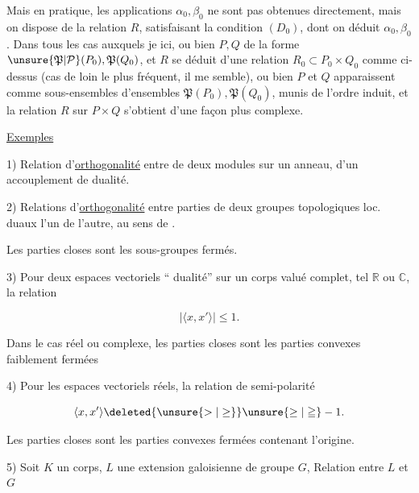Mais en pratique, les applications $\alpha_0,\beta_0$ ne sont pas obtenues directement, mais on dispose de la relation $R$, satisfaisant la condition $(D_0)$, dont on déduit $\alpha_0,\beta_0$. Dans tous les cas auxquels je   ici, ou bien $P,Q$  de la forme $\unsure{\mathfrak P|\mathcal P}(P_0),\mathfrak P(Q_0)$, et $R$ se déduit d'une relation $R_0\subset P_0\times Q_0$ comme ci-dessus (cas de loin le plus fréquent, il me semble), ou bien $P$ et $Q$ apparaissent comme sous-ensembles  d'ensembles $\mathfrak P(P_0),\mathfrak P(Q_0)$, munis de l'ordre induit, et la relation $R$ sur $P\times Q$ s'obtient d'une façon plus complexe.

\uline{Exemples}

1) Relation d'\uline{orthogonalité} entre  de deux modules sur un anneau,  d'un accouplement de dualité. 


2) Relations d'\uline{orthogonalité} entre parties de deux groupes topologiques  loc.  duaux l'un de l'autre, au sens de .

Les parties closes sont les sous-groupes fermés.

3) Pour deux espaces vectoriels `` dualité'' sur un corps valué complet, tel $\mathbb R$ ou $\mathbb C$, la relation

\[
 |\langle x,x'\rangle|\leq 1.
\]

Dans le cas réel ou complexe, les parties closes sont les parties convexes  faiblement fermées

4) Pour les espaces vectoriels réels, la relation de semi-polarité

\[
 \langle x,x'\rangle\deleted{\unsure{>|\geq}}\unsure{\geq|\geqq}-1.
\]

Les parties closes sont les parties convexes  fermées contenant l'origine.

5) Soit $K$ un corps,  $L$ une extension galoisienne de groupe $G$, Relation entre $L$ et $G$


